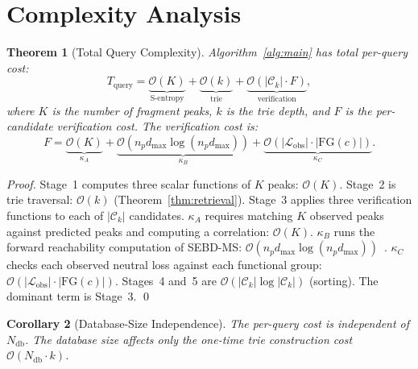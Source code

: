\documentclass[twocolumn,10pt,a4paper]{article}
\theoremstyle{thmstyle}
\newtheorem{theorem}{Theorem}[section]
\newtheorem{corollary}[theorem]{Corollary}
\theoremstyle{definition}
\theoremstyle{remark}
\newcommand{\calC}{\mathcal{C}}
\newcommand{\calL}{\mathcal{L}}
\begin{document}
\section{Complexity Analysis}
\label{sec:complexity}

\begin{theorem}[Total Query Complexity]
\label{thm:complexity}
Algorithm~\ref{alg:main} has total per-query cost:
\begin{equation}
T_{\mathrm{query}} = \underbrace{\mathcal{O}(K)}_{\text{S-entropy}} +
  \underbrace{\mathcal{O}(k)}_{\text{trie}} +
  \underbrace{\mathcal{O}(|\calC_k| \cdot F)}_{\text{verification}},
\label{eq:complexity}
\end{equation}
where $K$ is the number of fragment peaks, $k$ is the trie depth, and
$F$ is the per-candidate verification cost. The verification cost is:
\begin{equation}
F = \underbrace{\mathcal{O}(K)}_{\kappa_A} +
  \underbrace{\mathcal{O}(n_p d_{\max} \log(n_p d_{\max}))}_{\kappa_B} +
  \underbrace{\mathcal{O}(|\calL_{\mathrm{obs}}| \cdot
    |\mathrm{FG}(c)|)}_{\kappa_C}.
\label{eq:F}
\end{equation}
\end{theorem}

\begin{proof}
Stage~1 computes three scalar functions of $K$ peaks: $\mathcal{O}(K)$.
Stage~2 is trie traversal: $\mathcal{O}(k)$
(Theorem~\ref{thm:retrieval}). Stage~3 applies three verification
functions to each of $|\calC_k|$ candidates. $\kappa_A$ requires
matching $K$ observed peaks against predicted peaks and computing
a correlation: $\mathcal{O}(K)$. $\kappa_B$ runs the forward
reachability computation of SEBD-MS: $\mathcal{O}(n_p d_{\max}
\log(n_p d_{\max}))$~\citep{sachikonye2024partition}. $\kappa_C$
checks each observed neutral loss against each functional group:
$\mathcal{O}(|\calL_{\mathrm{obs}}| \cdot |\mathrm{FG}(c)|)$. Stages~4
and~5 are $\mathcal{O}(|\calC_k| \log |\calC_k|)$ (sorting). The
dominant term is Stage~3. \qed
\end{proof}

\begin{corollary}[Database-Size Independence]
\label{cor:db-independence}
The per-query cost is independent of $N_{\mathrm{db}}$. The database
size affects only the one-time trie construction cost
$\mathcal{O}(N_{\mathrm{db}} \cdot k)$.
\end{corollary}
\end{document}
